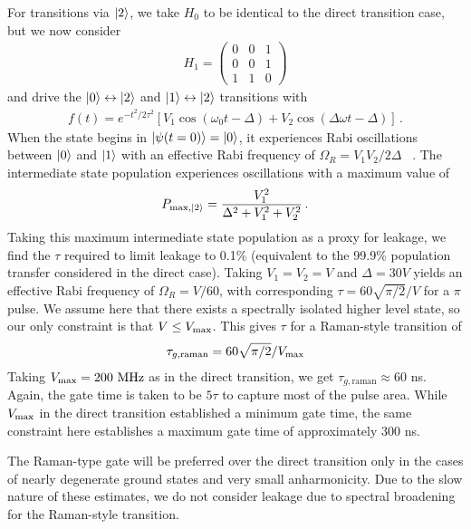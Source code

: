 For transitions via $\ket{2}$, we take $H_0$ to be identical to the direct transition case, but we now consider
\begin{align}
H_1 = \begin{pmatrix}
    0 & 0 & 1 \\
    0 & 0 & 1 \\
    1 & 1 & 0
\end{pmatrix}
\end{align}
and drive the $\ket{0}\leftrightarrow\ket{2}$ and $\ket{1}\leftrightarrow\ket{2}$ transitions with
\begin{align}
    f(t) = e^{-t^2/2\tau^2}[V_1\cos(\omega_0 t - \Delta) + V_2\cos(\Delta\omega t - \Delta)] \, .
\end{align}
When the state begins in $\ket{\psi(t=0)} = \ket{0}$, it experiences Rabi oscillations between $\ket{0}$ and $\ket{1}$ with an effective Rabi frequency of $\Omega_R = V_1V_2/2\Delta$ ~\cite{gyenisMovingTransmonNoiseProtected2021b}. The intermediate state population experiences oscillations with a maximum value of 
\begin{align}
    P_{\max,\ket{2}} = \frac{V_1^2}{\Delta^2 + V_1^2 + V_2^2} \, .
\end{align}
Taking this maximum intermediate state population as a proxy for leakage, we find the $\tau$ required to limit leakage to 0.1\% (equivalent to the 99.9\% population transfer considered in the direct case). Taking $V_1 = V_2 = V$ and $\Delta = 30 V$ yields an effective Rabi frequency of $\Omega_R = V/60$, with corresponding $\tau = 60\sqrt{\pi/2}/V$ for a $\pi$ pulse. We assume here that there exists a spectrally isolated higher level state, so our only constraint is that $V \leq V_{\rm max}$. This gives $\tau$ for a Raman-style transition of
\begin{align}
    \tau_{g,\textrm{raman}} = 60\sqrt{\pi/2}/V_{\rm max}
\end{align}
Taking $V_{\rm max} = 200 \textrm{ MHz}$ as in the direct transition, we get $\tau_{g,\textrm{raman}} \approx 60$ ns. Again, the gate time is taken to be $5\tau$ to capture most of the pulse area. While $V_{\rm max}$ in the direct transition established a minimum gate time, the same constraint here establishes a maximum gate time of approximately $300$ ns.

The Raman-type gate will be preferred over the direct transition only in the cases of nearly degenerate ground states and very small anharmonicity. Due to the slow nature of these estimates, we do not consider leakage due to spectral broadening for the Raman-style transition.



